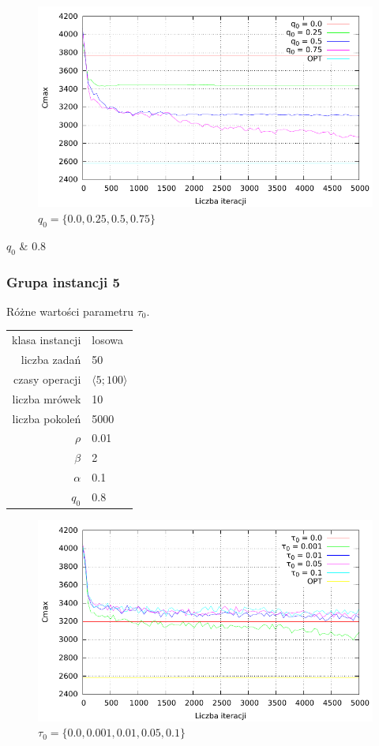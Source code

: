 \documentclass[10pt,a4paper]{article}
\begin{document}
\begin{figure}[h]
    \centering
    \includegraphics{./figures/inst01_rnd_qinit_smooth.pdf}
    \caption{$ q_0 = \{ 0.0, 0.25, 0.5, 0.75 \} $}
\end{figure}$ q_0 $ & 0.8 \\



\newpage
\subsubsection{Grupa instancji 5}
Różne wartości parametru $\tau_0$.

\begin{center}
\begin{tabular}{|r|l|}
  \hline
  klasa instancji & losowa \\
  liczba zadań & 50 \\
  czasy operacji & $ \langle 5;100 \rangle $  \\
  liczba mrówek & 10 \\
  liczba pokoleń & 5000 \\
  $ \rho $ & 0.01 \\
  $ \beta $ & 2 \\
  $ \alpha $ & 0.1 \\
  $ q_0 $ & 0.8 \\
  \hline
\end{tabular}
\end{center}

\begin{figure}[h]
    \centering
    \includegraphics{./figures/inst_01_rnd_phinit_smooth.pdf}
    \caption{$ \tau_0 = \{ 0.0, 0.001, 0.01, 0.05, 0.1 \} $}
\end{figure}
\end{document}
